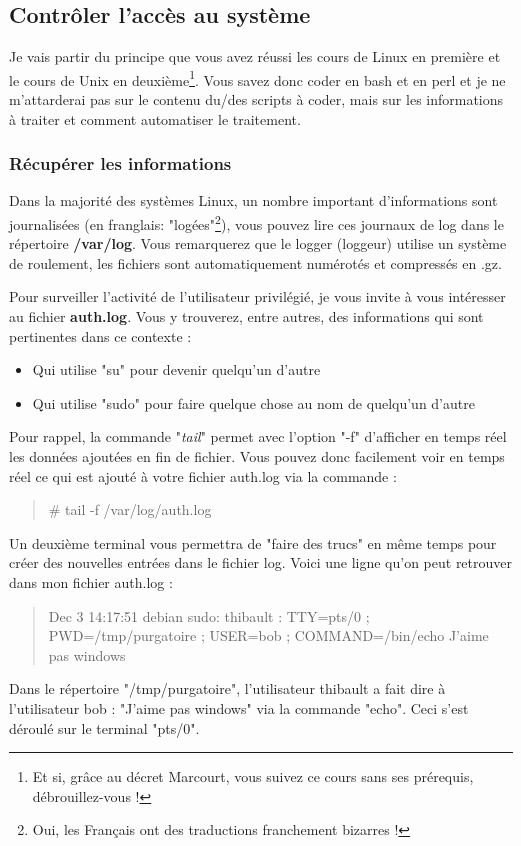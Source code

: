 \documentclass[a4paper,11pt]{article}
\newcommand{\commande}[1] {
    \begin{quote}
    \tt\raggedright #1
    \end{quote}
}
\begin{document}
\subsection{Contrôler l'accès au système}
\par Je vais partir du principe que vous avez réussi les cours de Linux en première et le cours de Unix en deuxième\footnote{Et si, grâce au décret Marcourt, vous suivez ce cours sans ses prérequis, débrouillez-vous !}. Vous savez donc coder en bash et en perl et je ne m'attarderai pas sur le contenu du/des scripts à coder, mais sur les informations à traiter et comment automatiser le traitement.

\subsubsection{Récupérer les informations}
\par Dans la majorité des systèmes Linux, un nombre important d'informations sont journalisées (en franglais: "logées"\footnote{Oui, les Français ont des traductions franchement bizarres !}), vous pouvez lire ces journaux de log dans le répertoire \textbf{/var/log}. Vous remarquerez que le logger (loggeur) utilise un système de roulement, les fichiers sont automatiquement numérotés et compressés en .gz.
\par Pour surveiller l'activité de l'utilisateur privilégié, je vous invite à vous intéresser au fichier \textbf{auth.log}. Vous y trouverez, entre autres, des informations qui sont pertinentes dans ce contexte :
\begin{itemize}
    \item Qui utilise "su" pour devenir quelqu'un d'autre
    \item Qui utilise "sudo" pour faire quelque chose au nom de quelqu'un d'autre
\end{itemize}
\par Pour rappel, la commande "\emph{tail}" permet avec l'option "-f" d'afficher en temps réel les données ajoutées en fin de fichier. Vous pouvez donc facilement voir en temps réel ce qui est ajouté à votre fichier auth.log via la commande :
\commande{\# tail -f /var/log/auth.log}
\par Un deuxième terminal vous permettra de "faire des trucs" en même temps pour créer des nouvelles entrées dans le fichier log. Voici une ligne qu'on peut retrouver dans mon fichier auth.log :
\commande{Dec 3 14:17:51 debian sudo:  thibault : TTY=pts/0 ; PWD=/tmp/purgatoire ; USER=bob ; COMMAND=/bin/echo J'aime pas windows}
\par Dans le répertoire "/tmp/purgatoire", l'utilisateur thibault a fait dire à l'utilisateur bob : "J'aime pas windows" via la commande "echo". Ceci s'est déroulé sur le terminal "pts/0".
\end{document}
